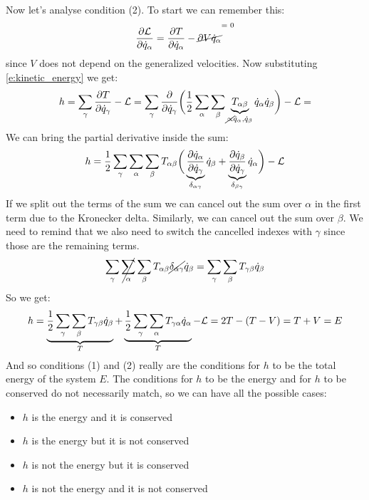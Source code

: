 Now let's analyse condition (2). To start we can remember this:
\begin{equation}
    \partialD{\lagr}{\dot{q}_{\alpha}} = \dfrac{\partial T}{\partial \dot{q}_{\alpha}} - \crossout{\partial{V}{\dot{q}_{\alpha}}}
\end{equation}
since $V$ does not depend on the generalized velocities. Now substituting \eqref{e:kinetic_energy} we get:
\begin{equation}
    h = \displaystyle\sum_{\gamma}\dfrac{\partial T}{\partial \dot{q}_{\gamma}} - \mathcal{L} = \displaystyle\sum_{\gamma}\dfrac{\partial}{\partial \dot{q}_{\gamma}}\bigg(\dfrac{1}{2}\displaystyle\sum_{\alpha}\displaystyle\sum_{\beta}\underbrace{T_{\alpha \beta}}_{\cancel{\propto} \dot{q}_{\alpha}, \dot{q}_{\beta}}\dot{q}_{\alpha}\dot{q}_{\beta}\bigg)  - \mathcal{L} =
\end{equation}
We can bring the partial derivative inside the sum:
\begin{equation}
    h = \dfrac{1}{2}\displaystyle\sum_{\gamma}\displaystyle\sum_{\alpha}\displaystyle\sum_{\beta}T_{\alpha \beta}\bigg(\underbrace{\dfrac{\partial \dot{q}_{\alpha}}{\partial \dot{q}_{\gamma}}}_{\delta_{\alpha \gamma}}\dot{q}_{\beta} + \underbrace{\dfrac{\partial \dot{q}_{\beta}}{\partial \dot{q}_{\gamma}}}_{\delta_{\beta \gamma}}\dot{q}_{\alpha}\bigg) - \mathcal{L}
\end{equation}
If we split out the terms of the sum we can cancel out the sum over $\alpha$ in the first term due to the Kronecker delta. Similarly, we can cancel out the sum over $\beta$. We need to remind that we also need to switch the cancelled indexes with $\gamma$ since those are the remaining terms.
\begin{equation}
    \displaystyle\sum_{\gamma}\cancel{\displaystyle\sum_{\alpha}}\displaystyle\sum_{\beta}T_{\alpha \beta }\cancel{\delta_{\alpha \gamma}}\dot{q}_{\beta} = \displaystyle\sum_{\gamma}\displaystyle\sum_{\beta}T_{\gamma \beta }\dot{q}_{\beta}
\end{equation}
So we get:
\begin{equation}
    h = \underbrace{\dfrac{1}{2}\displaystyle\sum_{\gamma}\displaystyle\sum_{\beta}T_{\gamma \beta }\dot{q}_{\beta}}_{T} + \underbrace{\dfrac{1}{2}\displaystyle\sum_{\gamma}\displaystyle\sum_{\alpha}T_{\gamma \alpha }\dot{q}_{\alpha}}_{T} - \mathcal{L} = 2T - (T-V) = T + V = E
\end{equation}
And so conditions (1) and (2) really are the conditions for $h$ to be the total energy of the system $E$. The conditions for $h$ to be the energy and for $h$ to be conserved do not necessarily match, so we can have all the possible cases:
\begin{itemize}
    \item $h$ is the energy and it is conserved
    \item $h$ is the energy but it is not conserved
    \item $h$ is not the energy but it is conserved
    \item $h$ is not the energy and it is not conserved
\end{itemize}
